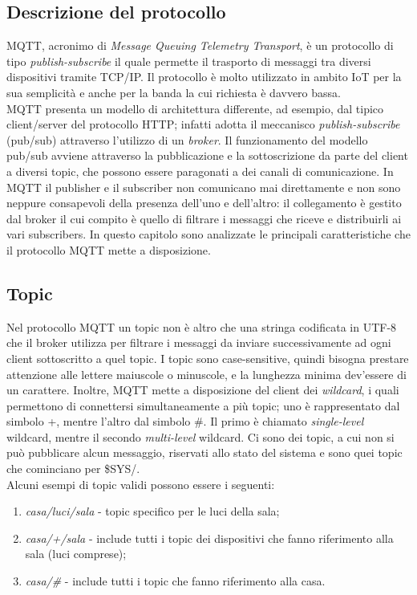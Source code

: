 \documentclass[Lau,binding=0.6cm,noexaminfo=true]{sapthesis}
\begin{document}
\begin{large}

\section{Descrizione del protocollo}

MQTT, acronimo di \textit{Message Queuing Telemetry Transport}, è un protocollo di tipo \textit{publish-subscribe} il quale permette il trasporto di messaggi tra diversi dispositivi tramite TCP/IP. Il protocollo è molto utilizzato in ambito IoT per la sua semplicità e anche per la banda la cui richiesta è davvero bassa. \\

MQTT presenta un modello di architettura differente, ad esempio, dal tipico client/server del protocollo HTTP; infatti adotta il meccanisco \textit{publish-subscribe} (pub/sub) attraverso l'utilizzo di un \textit{broker}. Il funzionamento del modello pub/sub avviene attraverso la pubblicazione e la sottoscrizione da parte del client a diversi topic, che possono essere paragonati a dei canali di comunicazione. In MQTT il publisher e il subscriber non comunicano mai direttamente e non sono neppure consapevoli della presenza dell'uno e dell'altro: il collegamento è gestito dal broker il cui compito è quello di filtrare i messaggi che riceve e distribuirli ai vari subscribers. 
In questo capitolo sono analizzate le principali caratteristiche che il protocollo MQTT mette a disposizione.

\subsection{Topic}
Nel protocollo MQTT un topic non è altro che una stringa codificata in UTF-8 che il broker utilizza per filtrare i messaggi da inviare successivamente ad ogni client sottoscritto a quel topic. I topic sono case-sensitive, quindi bisogna prestare attenzione alle lettere maiuscole o minuscole, e la lunghezza minima dev'essere di un carattere. Inoltre, MQTT mette a disposizione del client dei \textit{wildcard}, i quali permettono di connettersi simultaneamente a più topic; uno è rappresentato dal simbolo +, mentre l'altro dal simbolo \#. Il primo è chiamato \textit{single-level} wildcard, mentre il secondo \textit{multi-level} wildcard. Ci sono dei topic, a cui non si può pubblicare alcun messaggio, riservati allo stato del sistema e sono quei topic che cominciano per \$SYS/. \\
Alcuni esempi di topic validi possono essere i seguenti: 
\begin{enumerate}
\item \textit{casa/luci/sala} - topic specifico per le luci della sala;
\item \textit{casa/+/sala} - include tutti i topic dei dispositivi che fanno riferimento alla sala (luci comprese);
\item \textit{casa/\#} - include tutti i topic che fanno riferimento alla casa.
\end{enumerate}



\end{large}
\end{document}

